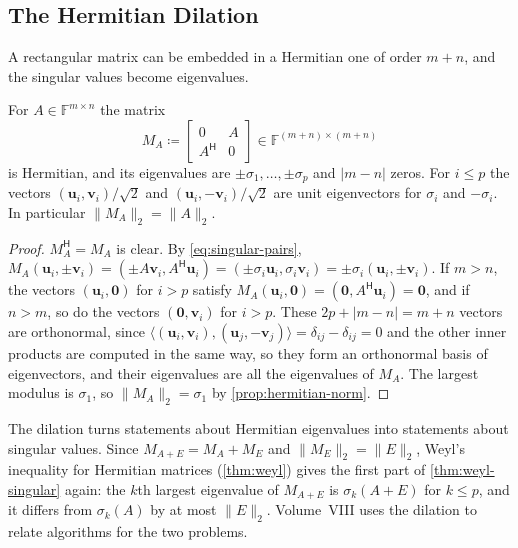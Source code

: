 \subsection{The Hermitian Dilation}

A rectangular matrix can be embedded in a Hermitian one of order $m+n$, and the singular values become eigenvalues.

\begin{proposition}
\label{prop:dilation}
For $A\in\mathbb F^{m\times n}$ the matrix
\[
M_A\coloneqq\begin{bmatrix}0&A\\A^{\mathsf H}&0\end{bmatrix}\in\mathbb F^{(m+n)\times(m+n)}
\]
is Hermitian, and its eigenvalues are $\pm\sigma_1,\ldots,\pm\sigma_p$ and $|m-n|$ zeros. For $i\le p$ the vectors $(\mathbf u_i,\mathbf v_i)/\sqrt2$ and $(\mathbf u_i,-\mathbf v_i)/\sqrt2$ are unit eigenvectors for $\sigma_i$ and $-\sigma_i$. In particular $\|M_A\|_2=\|A\|_2$.
\end{proposition}

\begin{proof}
$M_A^{\mathsf H}=M_A$ is clear. By \eqref{eq:singular-pairs}, $M_A(\mathbf u_i,\pm\mathbf v_i)=(\pm A\mathbf v_i,A^{\mathsf H}\mathbf u_i)=(\pm\sigma_i\mathbf u_i,\sigma_i\mathbf v_i)=\pm\sigma_i(\mathbf u_i,\pm\mathbf v_i)$. If $m>n$, the vectors $(\mathbf u_i,\mathbf 0)$ for $i>p$ satisfy $M_A(\mathbf u_i,\mathbf 0)=(\mathbf 0,A^{\mathsf H}\mathbf u_i)=\mathbf 0$, and if $n>m$, so do the vectors $(\mathbf 0,\mathbf v_i)$ for $i>p$. These $2p+|m-n|=m+n$ vectors are orthonormal, since $\langle(\mathbf u_i,\mathbf v_i),(\mathbf u_j,-\mathbf v_j)\rangle=\delta_{ij}-\delta_{ij}=0$ and the other inner products are computed in the same way, so they form an orthonormal basis of eigenvectors, and their eigenvalues are all the eigenvalues of $M_A$. The largest modulus is $\sigma_1$, so $\|M_A\|_2=\sigma_1$ by \cref{prop:hermitian-norm}.
\end{proof}

The dilation turns statements about Hermitian eigenvalues into statements about singular values. Since $M_{A+E}=M_A+M_E$ and $\|M_E\|_2=\|E\|_2$, Weyl's inequality for Hermitian matrices (\cref{thm:weyl}) gives the first part of \cref{thm:weyl-singular} again: the $k$th largest eigenvalue of $M_{A+E}$ is $\sigma_k(A+E)$ for $k\le p$, and it differs from $\sigma_k(A)$ by at most $\|E\|_2$. Volume~VIII uses the dilation to relate algorithms for the two problems.

